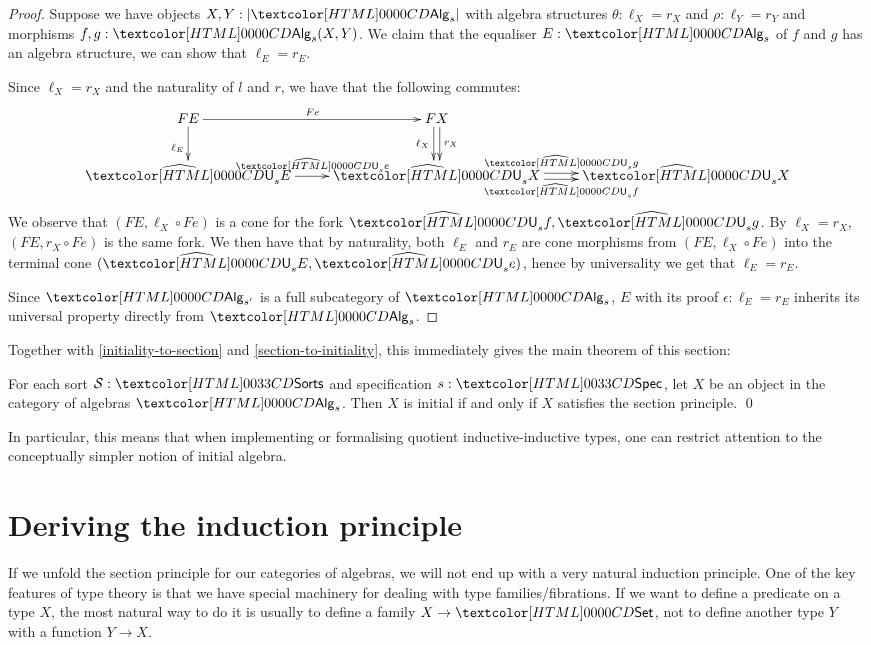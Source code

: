 \begin{proof}
  Suppose we have objects $X, Y : | \Alg_s |$ with algebra structures
  $\theta : \ell_X = r_X$ and $\rho : \ell_Y = r_Y$ and morphisms
  $f, g : \Alg_s(X,Y)$. We claim that the equaliser $E : \Alg_s$ of
  $f$ and $g$ has an algebra structure, \ie we can show that
  $\ell_E = r_E$.

  Since $\ell_X = r_X$ and the naturality of $l$ and $r$, we have that
  the following commutes:
  $$
  \xymatrix{
    FE \ar[r]^{Fe} \ar[d]_{\ell_E} &FX \ar@<-.5ex>[d]_-{\ell_X} \ar@<.5ex>[d]^-{r_X} \\
    \extendfunc{\Und}_s E \ar[r]^{\extendfunc{\Und}_s e} &\extendfunc{\Und}_s X \ar@<-.5ex>[r]_-{\extendfunc{\Und}_s f} \ar@<.5ex>[r]^-{\extendfunc{\Und}_s g} &\extendfunc{\Und}_s X
  }
  $$
  We observe that $(FE, \ell_X \circ Fe)$ is a cone for the fork
  $\extendfunc{\Und}_s f,\extendfunc{\Und}_s g$. By $\ell_X = r_X$, $(FE, r_X \circ Fe)$ is the same fork. We
  then have that by naturality, both $\ell_E$ and $r_E$ are cone
  morphisms from $(FE, \ell_X \circ Fe)$ into the terminal cone
  $(\extendfunc{\Und}_s E,\extendfunc{\Und}_s e)$, hence by universality we get that $\ell_E = r_E$.

  Since $\Alg_{s'}$ is a full subcategory of $\Alg_s$, $E$ with its
  proof $\epsilon : \ell_E = r_E$ inherits its universal property
  directly from $\Alg_s$.
\end{proof}

Together with \cref{initiality-to-section} and
\cref{section-to-initiality}, this immediately gives the main theorem
of this section:

\begin{theorem}
\label{initiality-section-thm}
  For each sort $\Ss : \sortsty$ and specification $s : \specty$, let $X$
  be an object in the category of algebras $\Alg_s$. Then $X$ is
  initial if and only if $X$ satisfies the section principle. \qed
\end{theorem}

In particular, this means that when implementing or formalising
quotient inductive-inductive types, one can restrict attention to the
conceptually simpler notion of initial algebra.

\section{Deriving the induction principle}

If we unfold the section principle for our categories of algebras, we
will not end up with a very natural induction principle. One of the
key features of type theory is that we have special machinery for
dealing with type families/fibrations. If we want to define a
predicate on a type $X$, the most natural way to do it is usually to
define a family $X \to \Set$, not to define another type $Y$ with a
function $Y \to X$.

